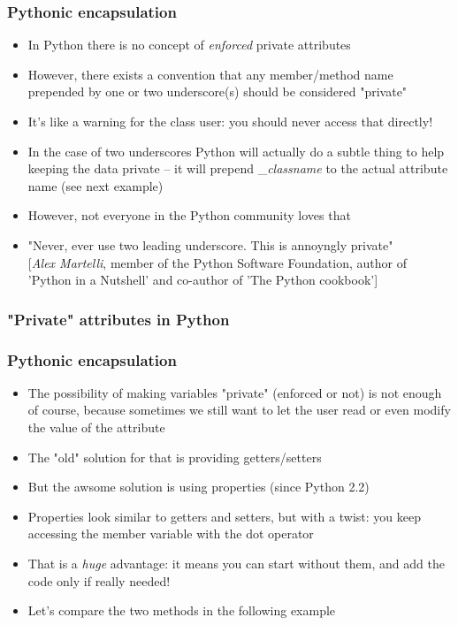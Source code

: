 \documentclass[9pt]{beamer}
\begin{document}
\begin{frame}
  \frametitle{Pythonic encapsulation}
  
  \begin{itemize}
    \item In Python there is no concept of \emph{enforced} private attributes
    \medskip
    \item However, there exists a convention that any member/method name prepended by one or two underscore(s) should be considered "private"
    \medskip
    \item It's like a warning for the class user: you should never access that directly!
    \medskip
    \item In the case of two underscores Python will actually do a subtle thing to help keeping the data private -- it will 
          prepend \_\emph{classname} to the actual attribute name (see next example)
    \medskip
    \item However, not everyone in the Python community loves that
    \medskip
    \item "Never, ever use two leading underscore. This is annoyngly private"\\
           \vspace{0.02\textheight}
           \footnotesize [\emph{Alex Martelli}, member of the Python Software Foundation, author of 'Python in a Nutshell' and co-author of 'The Python cookbook']
  \end{itemize}
  
\end{frame}


\begin{frame}
  \frametitle{"Private" attributes in Python}
  
\end{frame}


\begin{frame}
  \frametitle{Pythonic encapsulation}
  
  \begin{itemize}
    \small
    \item The possibility of making variables "private" (enforced or not) is not enough of course,
          because sometimes we still want to let the user read or even modify the value of the attribute
    \bigskip
    \item The "old" solution for that is providing getters/setters
    \bigskip
    \item But the awsome solution is using \alert{properties} (since Python 2.2)
    \bigskip
    \item Properties look similar to getters and setters, but with a twist: you keep
          accessing the member variable with the dot operator
    \bigskip
    \item That is a \emph{huge} advantage: it means you can start without them, and add the code only if really needed!
    \bigskip
    \item Let's compare the two methods in the following example
  \end{itemize}
  
\end{frame}
\end{document}
